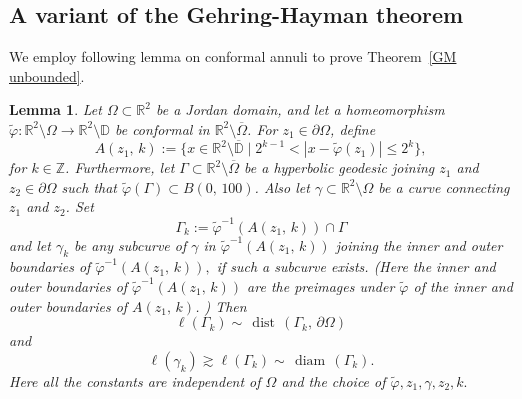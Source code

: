 \documentclass[reqno,11pt]{amsart}
\makeatletter
\def\dist{{\mathop\mathrm{\,dist\,}}}
\def\wz{\widetilde}
\def\diam{{\mathop\mathrm{\,diam\,}}}
\newtheorem{lem}[thm]{Lemma}%
\numberwithin{equation}{section}
\theoremstyle{remark}
\makeatother
\begin{document}
\subsection{A variant of the Gehring-Hayman theorem}




We employ following lemma on conformal annuli to prove Theorem~\ref{GM unbounded}.

\begin{lem}\label{lengthtransfer}
Let  $\Omega\subset \mathbb R^2$ be a Jordan domain, and let a homeomorphism 
$\wz \varphi\colon \mathbb R^2\setminus \Omega \to 
 \mathbb R^2\setminus \mathbb D$ be conformal in $\mathbb R^2 \setminus
\overline{\Omega}$. 
For $z_1%
\in \partial \Omega$, define
\[
A(z_1,\,k):=\{x\in \mathbb R^2\setminus \overline{\mathbb D} 
\mid 2^{k-1}< |x-\wz \varphi (z_1)|\le 2^{k}\},  
\]
for %
$k\in \mathbb Z$. 
Furthermore, let $\Gamma\subset \mathbb R^2\setminus \overline{\Omega}$ 
be a hyperbolic geodesic joining $z_1$  and $z_2\in \partial \Omega$ such that $\wz \varphi (\Gamma)\subset B(0,\,100)$. Also let
$\gamma\subset \mathbb R^2 \setminus \Omega$ 
be
a curve connecting $z_1$ and $z_2$. 
Set
\[
\Gamma_{k}:=\wz \varphi^{-1}(A(z_1,\,k))\cap \Gamma 
\]
and let $\gamma_{k}$ 
be any subcurve of $\gamma$ in $\wz \varphi^{-1}(A(z_1,\,k))$
joining the inner and outer boundaries of
$\wz \varphi^{-1}(A(z_1,\,k)),$ if such a subcurve exists. 
(Here the inner and outer boundaries of $\wz \varphi^{-1}(A(z_1,\,k))$ are the preimages under $\wz \varphi$ of the inner and outer boundaries of $A(z_1,\,k)$. )
Then 
\begin{equation}\label{equ 1002}
\ell(\Gamma_{k})\sim \dist(\Gamma_{k},\,\partial 
\Omega)
\end{equation}
 and 
$$\ell(\gamma_{k})\gtrsim 
\ell(\Gamma_{k})\sim \diam(\Gamma_{k}).$$
Here all the constants are independent of $\Omega$ and the choice
of $\wz \varphi,z_1,\gamma,z_2,k.$ 
\end{lem}
\end{document}
